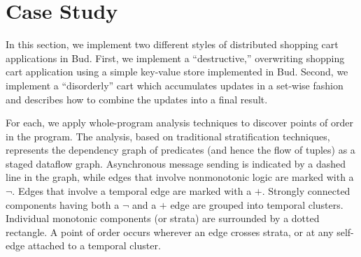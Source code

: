 \section{Case Study}
\label{sec:case}





In this section, we implement two different styles of distributed shopping cart
applications in Bud.  First, we implement a ``destructive,'' overwriting
shopping cart application using a simple key-value store implemented in Bud.
Second, we implement a ``disorderly'' cart which accumulates updates in a 
set-wise fashion and describes how to combine the updates into a final result.

For each, we apply whole-program analysis techniques to discover points of 
order in the program.  The analysis, based on traditional stratification
techniques, represents the dependency graph of predicates (and hence the 
flow of tuples) as a staged dataflow graph.  Asynchronous message sending
is indicated by a dashed line in the graph, while edges that involve 
nonmonotonic logic are marked with a $\lnot$.  Edges that involve a temporal 
edge are marked with a $+$.  Strongly connected components having both a $\lnot$ and a $+$ edge are grouped into temporal clusters.  Individual monotonic components 
(or strata) are surrounded by a dotted rectangle.  A point of order occurs
wherever an edge crosses strata, or at any self-edge attached to a temporal cluster.

